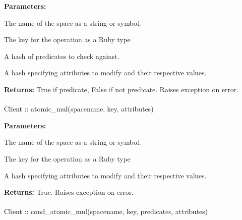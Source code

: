 \noindent\textbf{Parameters:}
\begin{description}[labelindent=\widthof{{\code{predicates}}},leftmargin=*,noitemsep,nolistsep,align=right]
\item[\code{spacename}] The name of the space as a string or symbol.
\item[\code{key}] The key for the operation as a Ruby type
\item[\code{predicates}] A hash of predicates to check against.
\item[\code{attributes}] A hash specifying attributes to modify and their respective values.
\end{description}

\noindent\textbf{Returns:}
True if predicate, False if not predicate.  Raises exception on error.

\paragraph{}
\label{api:ruby:atomic_mul}
\begin{ccode}
Client :: atomic_mul(spacename, key, attributes)
\end{ccode}
\funcdesc 

\noindent\textbf{Parameters:}
\begin{description}[labelindent=\widthof{{\code{attributes}}},leftmargin=*,noitemsep,nolistsep,align=right]
\item[\code{spacename}] The name of the space as a string or symbol.
\item[\code{key}] The key for the operation as a Ruby type
\item[\code{attributes}] A hash specifying attributes to modify and their respective values.
\end{description}

\noindent\textbf{Returns:}
True.  Raises exception on error.

\paragraph{}
\label{api:ruby:cond_atomic_mul}
\begin{ccode}
Client :: cond_atomic_mul(spacename, key, predicates, attributes)
\end{ccode}
\funcdesc 

